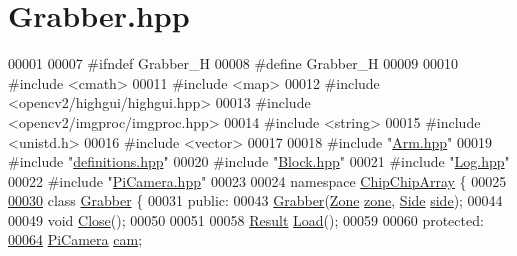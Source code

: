 \hypertarget{Grabber_8hpp_source}{\section{Grabber.\+hpp}
\label{Grabber_8hpp_source}
}

\begin{DoxyCode}
00001 
00007 \textcolor{preprocessor}{#ifndef Grabber\_H}
00008 \textcolor{preprocessor}{#define Grabber\_H}
00009 
00010 \textcolor{preprocessor}{#include <cmath>}
00011 \textcolor{preprocessor}{#include <map>}
00012 \textcolor{preprocessor}{#include <opencv2/highgui/highgui.hpp>}
00013 \textcolor{preprocessor}{#include <opencv2/imgproc/imgproc.hpp>}
00014 \textcolor{preprocessor}{#include <string>}
00015 \textcolor{preprocessor}{#include <unistd.h>}
00016 \textcolor{preprocessor}{#include <vector>}
00017 
00018 \textcolor{preprocessor}{#include "\hyperlink{Arm_8hpp}{Arm.hpp}"}
00019 \textcolor{preprocessor}{#include "\hyperlink{definitions_8hpp}{definitions.hpp}"}
00020 \textcolor{preprocessor}{#include "\hyperlink{Block_8hpp}{Block.hpp}"}
00021 \textcolor{preprocessor}{#include "\hyperlink{Log_8hpp}{Log.hpp}"}
00022 \textcolor{preprocessor}{#include "\hyperlink{PiCamera_8hpp}{PiCamera.hpp}"}
00023 
00024 \textcolor{keyword}{namespace }\hyperlink{namespaceChipChipArray}{ChipChipArray} \{
00025 
\hypertarget{Grabber_8hpp_source_l00030}{}\hyperlink{classChipChipArray_1_1Grabber}{00030}     \textcolor{keyword}{class }\hyperlink{classChipChipArray_1_1Grabber}{Grabber} \{
00031         \textcolor{keyword}{public}:
00043             \hyperlink{classChipChipArray_1_1Grabber_a7333f40c135fbe92d59651f75032b4e7}{Grabber}(\hyperlink{definitions_8hpp_adbd1e7a33d3e1751c7b2aa2562d0ecb9}{Zone} \hyperlink{classChipChipArray_1_1Grabber_ab57efe6e0b6f369b19528285a278d967}{zone}, \hyperlink{definitions_8hpp_a03325a8a9d4f105db5e37dd587128142}{Side} \hyperlink{classChipChipArray_1_1Grabber_a8afbaefae7c767c862fd1bf13968539b}{side});
00044 
00049             \textcolor{keywordtype}{void} \hyperlink{classChipChipArray_1_1Grabber_aacf089ceb4aa5b263c2cc702fb3daf74}{Close}();
00050 
00051 
00058             \hyperlink{definitions_8hpp_ab84ebabb02540c4a7ec341a213abf1dc}{Result} \hyperlink{classChipChipArray_1_1Grabber_a56639f8f9ba9468bce4b6d69ceb2eb54}{Load}();
00059 
00060         \textcolor{keyword}{protected}:
\hypertarget{Grabber_8hpp_source_l00064}{}\hyperlink{classChipChipArray_1_1Grabber_a726bcc2367a719cb84de92a981947622}{00064}             \hyperlink{classChipChipArray_1_1PiCamera}{PiCamera} \hyperlink{classChipChipArray_1_1Grabber_a726bcc2367a719cb84de92a981947622}{cam};

\end{DoxyCode}
